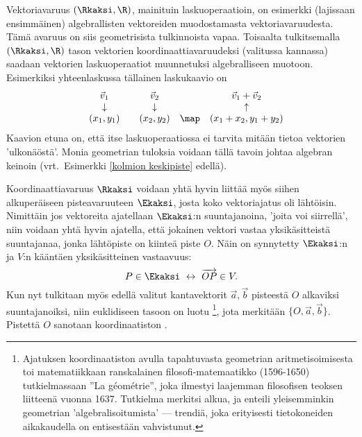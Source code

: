 Vektoriavaruus $(\Rkaksi,\R)$, mainituin laskuoperaatioin, on esimerkki (lajissaan ensimmäinen)
algebrallisten vektoreiden muodostamasta vektoriavaruudesta. Tämä avaruus on
siis geometrisista tulkinnoista vapaa. Toisaalta tulkitsemalla $(\Rkaksi,\R)$ tason vektorien
koordinaattiavaruudeksi (valitussa kannassa) saadaan vektorien laskuoperaatiot muunnetuksi 
algebralliseen muotoon. Esimerkiksi yhteenlaskussa tällainen laskukaavio on
\[
\begin{array}{cccccc}
&\vec v_1   &  &\vec v_2   &     &\vec v_1+\vec v_2 \\
&\downarrow &  &\downarrow &     &\uparrow \\ 
&(x_1,y_1)  &  &(x_2,y_2)  &\map &(x_1+x_2,y_1+y_2)
\end{array}
\]
Kaavion etuna on, että itse laskuoperaatiossa ei tarvita mitään tietoa vektorien 'ulkonäöstä'.
Monia geometrian tuloksia voidaan tällä tavoin johtaa algebran keinoin (vrt.\ Esimerkki 
\ref{kolmion keskipiste} edellä).

Koordinaattiavaruus $\Rkaksi$ voidaan yhtä hyvin liittää myös siihen alkuperäiseen 
pisteavaruuteen $\Ekaksi$, josta koko vektoriajatus oli lähtöisin. Nimittäin jos vektoreita 
ajatellaan $\Ekaksi$:n suuntajanoina, 'joita voi siirrellä', niin voidaan yhtä hyvin ajatella,
että jokainen vektori vastaa yksikäsitteistä suuntajanaa, jonka lähtöpiste on kiinteä piste $O$.
Näin on synnytetty $\Ekaksi$:n ja $V$:n kääntäen yksikäsitteinen vastaavuus:
\[
P \in \Ekaksi \ \leftrightarrow \ \overrightarrow{OP} \in V.
\]
Kun nyt tulkitaan myös edellä valitut kantavektorit $\vec a, \vec b$ pisteestä $O$ alkaviksi
suuntajanoiksi, niin euklidiseen tasoon on luotu \footnote[2]{Ajatuksen 
koordinaatiston avulla tapahtuvasta geometrian aritmetisoimisesta toi matematiikkaan 
ranskalainen filosofi-matemaatikko  (1596-1650) tutkielmassaan 
''La g\'eom\'etrie'', joka ilmestyi laajemman filosofisen teoksen liitteenä vuonna 1637. 
Tutkielma merkitsi  alkua, ja enteili yleisemminkin geometrian 
'algebralisoitumista' --- trendiä, joka erityisesti tietokoneiden aikakaudella on entisestään
vahvistunut. }, jota merkitään $\{O,\vec a,\vec b\}$. Pistettä $O$
sanotaan koordinaatiston 
%
.

